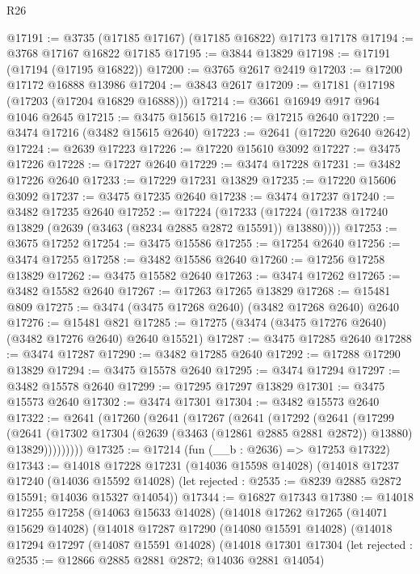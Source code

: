 \begin{lexlean}{R26}
\begin{coremodule}
@17191 := @3735 (@17185 @17167) (@17185 @16822) @17173 @17178
@17194 := @3768 @17167 @16822 @17185
@17195 := @3844 @13829
@17198 := @17191 (@17194 (@17195 @16822))
@17200 := @3765 @2617 @2419
@17203 := @17200 @17172 @16888 @13986
@17204 := @3843 @2617
@17209 := @17181 (@17198 (@17203 (@17204 @16829 @16888)))
@17214 := @3661 @16949 @917 @964 @1046 @2645
@17215 := @3475 @15615
@17216 := @17215 @2640
@17220 := @3474 @17216 (@3482 @15615 @2640)
@17223 := @2641 (@17220 @2640 @2642)
@17224 := @2639 @17223
@17226 := @17220 @15610 @3092
@17227 := @3475 @17226
@17228 := @17227 @2640
@17229 := @3474 @17228
@17231 := @3482 @17226 @2640
@17233 := @17229 @17231 @13829
@17235 := @17220 @15606 @3092
@17237 := @3475 @17235 @2640
@17238 := @3474 @17237
@17240 := @3482 @17235 @2640
@17252 := @17224
    (@17233 (@17224 (@17238 @17240 @13829 (@2639 (@3463 (@8234 @2885 @2872 @15591)) @13880))))
@17253 := @3675 @17252
@17254 := @3475 @15586
@17255 := @17254 @2640
@17256 := @3474 @17255
@17258 := @3482 @15586 @2640
@17260 := @17256 @17258 @13829
@17262 := @3475 @15582 @2640
@17263 := @3474 @17262
@17265 := @3482 @15582 @2640
@17267 := @17263 @17265 @13829
@17268 := @15481 @809
@17275 := @3474 (@3475 @17268 @2640) (@3482 @17268 @2640) @2640
@17276 := @15481 @821
@17285 := @17275 (@3474 (@3475 @17276 @2640) (@3482 @17276 @2640) @2640 @15521)
@17287 := @3475 @17285 @2640
@17288 := @3474 @17287
@17290 := @3482 @17285 @2640
@17292 := @17288 @17290 @13829
@17294 := @3475 @15578 @2640
@17295 := @3474 @17294
@17297 := @3482 @15578 @2640
@17299 := @17295 @17297 @13829
@17301 := @3475 @15573 @2640
@17302 := @3474 @17301
@17304 := @3482 @15573 @2640
@17322 := @2641
    (@17260
      (@2641
        (@17267
          (@2641
            (@17292
              (@2641
                (@17299
                  (@2641
                    (@17302 @17304 (@2639 (@3463 (@12861 @2885 @2881 @2872)) @13880) @13829)))))))))
@17325 := @17214 (fun (__b : @2636) => @17253 @17322)
@17343 := @14018
    @17228
    @17231
    (@14036 @15598 @14028)
    (@14018
      @17237
      @17240
      (@14036 @15592 @14028)
      (let rejected : @2535 := @8239 @2885 @2872 @15591; @14036 @15327 @14054))
@17344 := @16827 @17343
@17380 := @14018
    @17255
    @17258
    (@14063 @15633 @14028)
    (@14018
      @17262
      @17265
      (@14071 @15629 @14028)
      (@14018
        @17287
        @17290
        (@14080 @15591 @14028)
        (@14018
          @17294
          @17297
          (@14087 @15591 @14028)
          (@14018
            @17301
            @17304
            (let rejected : @2535 := @12866 @2885 @2881 @2872; @14036 @2881 @14054)

\end{coremodule}
\end{lexlean}

